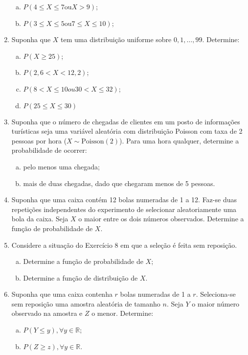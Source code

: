 \documentclass[../Notas.tex]{subfiles}
\begin{document}
\begin{enumerate}
\begin{enumerate}[a)]
    \item $P(4 \leq X \leq 7 \text{ou} X > 9)$;
    \item $P(3 \leq X \leq 5 \text{ou} 7 \leq X \leq 10)$;
    \end{enumerate}
    \item Suponha que $X$ tem uma distribuição uniforme sobre $0, 1, \dots , 99$. Determine:
    \begin{enumerate}[a)]
    \item $P(X \geq 25)$;
    \item $P(2,6 < X < 12,2)$;
    \item $P(8 < X \leq 10 ou 30 < X \leq 32)$;
    \item $P(25 \leq X \leq 30)$
    \end{enumerate}
    \item Suponha que o número de chegadas de clientes em um posto de informações turísticas seja uma variável aleatória com distribuição Poisson com taxa de 2 pessoas por hora ($X\sim\text{Poisson}(2)$). Para uma hora qualquer, determine a probabilidade de ocorrer:
    \begin{enumerate}[a)]
    \item pelo menos uma chegada;
    \item mais de duas chegadas, dado que chegaram menos de 5 pessoas.
    \end{enumerate}
    \item Suponha que uma caixa contém 12 bolas numeradas de 1 a 12. Faz-se duas repetições independentes do experimento de selecionar aleatoriamente uma bola da caixa. Seja $X$ o maior entre os dois números observados. Determine a função de probabilidade de $X$.
    \item Considere a situação do Exercício 8 em que a seleção é feita sem reposição. 
    \begin{enumerate}[a)]
    \item Determine a função de probabilidade de $X$;
    \item Determine a função de distribuição de $X$.
    \end{enumerate}
    \item Suponha que uma caixa contenha $r$ bolas numeradas de 1 a $r$. Seleciona-se sem reposição uma amostra aleatória de tamanho $n$. Seja $Y$ o maior número observado na amostra e $Z$ o menor. Determine:
    \begin{enumerate}[a)]
    \item $P(Y \leq y), \forall y \in \mathbb{R}$;
    \item $P(Z \geq z), \forall y \in \mathbb{R}$.

\end{enumerate}
\end{enumerate}
\end{document}
